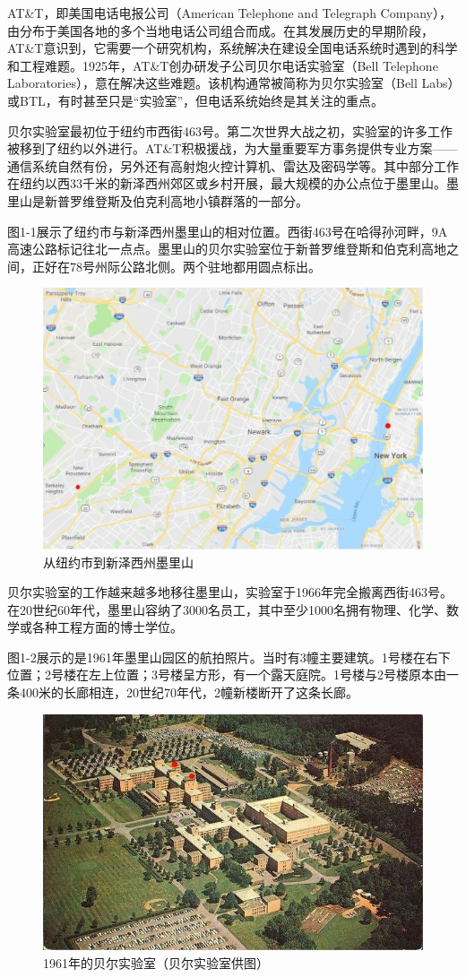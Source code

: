\documentclass[a4paper,12pt,UTF8,twoside]{ctexbook}
\begin{document}
AT\&T，即美国电话电报公司（American Telephone and Telegraph Company），由分布于美国各地的多个当地电话公司组合而成。在其发展历史的早期阶段，AT\&T意识到，它需要一个研究机构，系统解决在建设全国电话系统时遇到的科学和工程难题。1925年，AT\&T创办研发子公司贝尔电话实验室（Bell Telephone Laboratories），意在解决这些难题。该机构通常被简称为贝尔实验室（Bell Labs）或BTL，有时甚至只是“实验室”，但电话系统始终是其关注的重点。

贝尔实验室最初位于纽约市西街463号。第二次世界大战之初，实验室的许多工作被移到了纽约以外进行。AT\&T积极援战，为大量重要军方事务提供专业方案——通信系统自然有份，另外还有高射炮火控计算机、雷达及密码学等。其中部分工作在纽约以西33千米的新泽西州郊区或乡村开展，最大规模的办公点位于墨里山。墨里山是新普罗维登斯及伯克利高地小镇群落的一部分。

图1-1展示了纽约市与新泽西州墨里山的相对位置。西街463号在哈得孙河畔，9A高速公路标记往北一点点。墨里山的贝尔实验室位于新普罗维登斯和伯克利高地之间，正好在78号州际公路北侧。两个驻地都用圆点标出。

\begin{figure}[htbp]
	\centering
	\includegraphics[width=0.7\linewidth]{1}
	\caption{从纽约市到新泽西州墨里山}
	\label{fig:1}
\end{figure}

贝尔实验室的工作越来越多地移往墨里山，实验室于1966年完全搬离西街463号。在20世纪60年代，墨里山容纳了3000名员工，其中至少1000名拥有物理、化学、数学或各种工程方面的博士学位。

图1-2展示的是1961年墨里山园区的航拍照片。当时有3幢主要建筑。1号楼在右下位置；2号楼在左上位置；3号楼呈方形，有一个露天庭院。1号楼与2号楼原本由一条400米的长廊相连，20世纪70年代，2幢新楼断开了这条长廊。

\begin{figure}[htbp]
	\centering
	\includegraphics[width=0.7\linewidth]{2}
	\caption{1961年的贝尔实验室（贝尔实验室供图）}
	\label{fig:1}
\end{figure}
\end{document}
